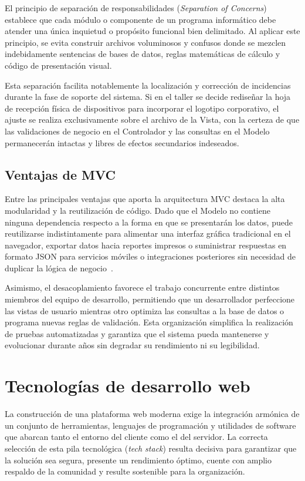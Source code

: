 El principio de separación de responsabilidades (\textit{Separation of Concerns}) establece que cada módulo o componente de un programa informático debe atender una única inquietud o propósito funcional bien delimitado. Al aplicar este principio, se evita construir archivos voluminosos y confusos donde se mezclen indebidamente sentencias de bases de datos, reglas matemáticas de cálculo y código de presentación visual.

Esta separación facilita notablemente la localización y corrección de incidencias durante la fase de soporte del sistema. Si en el taller se decide rediseñar la hoja de recepción física de dispositivos para incorporar el logotipo corporativo, el ajuste se realiza exclusivamente sobre el archivo de la Vista, con la certeza de que las validaciones de negocio en el Controlador y las consultas en el Modelo permanecerán intactas y libres de efectos secundarios indeseados.

\subsection{Ventajas de MVC}

Entre las principales ventajas que aporta la arquitectura MVC destaca la alta modularidad y la reutilización de código. Dado que el Modelo no contiene ninguna dependencia respecto a la forma en que se presentarán los datos, puede reutilizarse indistintamente para alimentar una interfaz gráfica tradicional en el navegador, exportar datos hacia reportes impresos o suministrar respuestas en formato JSON para servicios móviles o integraciones posteriores sin necesidad de duplicar la lógica de negocio~\cite{laravel_doc}.

Asimismo, el desacoplamiento favorece el trabajo concurrente entre distintos miembros del equipo de desarrollo, permitiendo que un desarrollador perfeccione las vistas de usuario mientras otro optimiza las consultas a la base de datos o programa nuevas reglas de validación. Esta organización simplifica la realización de pruebas automatizadas y garantiza que el sistema pueda mantenerse y evolucionar durante años sin degradar su rendimiento ni su legibilidad.

\section{Tecnologías de desarrollo web}

La construcción de una plataforma web moderna exige la integración armónica de un conjunto de herramientas, lenguajes de programación y utilidades de software que abarcan tanto el entorno del cliente como el del servidor. La correcta selección de esta pila tecnológica (\textit{tech stack}) resulta decisiva para garantizar que la solución sea segura, presente un rendimiento óptimo, cuente con amplio respaldo de la comunidad y resulte sostenible para la organización.

